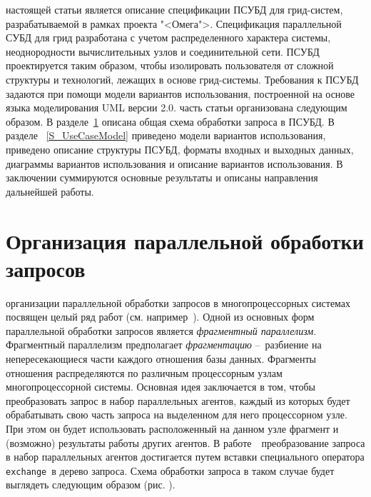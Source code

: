 \documentclass[11pt,oneside]{article}
\begin{document}
 настоящей статьи является описание спецификации ПСУБД для грид-систем, разрабатываемой в рамках проекта "<Омега">\cite{B_OMEGA}. Спецификация параллельной СУБД для грид разработана с учетом распределенного характера системы, неоднородности вычислительных узлов и соединительной сети. ПСУБД проектируется таким образом, чтобы изолировать пользователя от сложной структуры и технологий, лежащих в основе грид-системы. Требования к ПСУБД задаются при помощи модели вариантов использования, построенной на основе языка моделирования UML версии 2.0.
 часть статьи организована следующим образом. В разделе~\ref{S_ParQueryProcessing} описана общая схема обработки запроса в ПСУБД. В разделе ~\ref{S_UseCaseModel} приведено модели вариантов использования, приведено описание структуры ПСУБД, форматы входных и выходных данных, диаграммы вариантов использования и описание вариантов использования. В заключении суммируются основные результаты и описаны направления дальнейшей работы.

\section{Организация параллельной обработки запросов}\label{S_ParQueryProcessing}
 организации параллельной обработки запросов в многопроцессорных системах посвящен целый ряд работ (см. например~\cite{B_Sokolinsky2001, B_Aloisio2005, B_Dutra2004}). Одной из основных форм параллельной обработки запросов является \textit{фрагментный параллелизм}. Фрагментный параллелизм предполагает \textit{фрагментацию} \---~разбиение на непересекающиеся части каждого отношения базы данных. Фрагменты отношения распределяются по различным процессорным узлам многопроцессорной системы. Основная идея заключается в том, чтобы преобразовать запрос в набор параллельных агентов, каждый из которых будет обрабатывать свою часть запроса на выделенном для него процессорном узле. При этом он будет использовать расположенный на данном узле фрагмент и (возможно) результаты работы других агентов. В работе~\cite{B_Sokolinsky2001}~преобразование запроса в набор параллельных агентов достигается путем вставки специального оператора \texttt{exchange}~в дерево запроса. Схема обработки запроса в таком случае будет выглядеть следующим образом (рис. %
).

\end{document}
